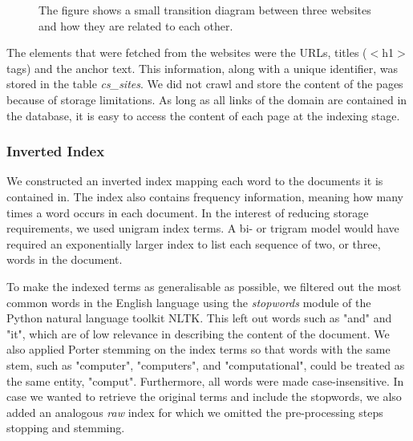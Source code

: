 \begin{figure}[!h]
\centering
\caption{The figure shows a small transition diagram between three websites and how they are related to each other.}
\label{fig:graph}
\end{figure}

The elements that were fetched from the websites were the URLs, titles ($<$h1$>$ tags) and the anchor text. This information, along with a unique identifier, was stored in the table \emph{cs\_sites}. We did not crawl and store the content of the pages because of storage limitations. As long as all links of the domain are contained in the database, it is easy to access the content of each page at the indexing stage.


\subsubsection{Inverted Index} %
\label{ssub:inverted_index}

We constructed an inverted index mapping each word to the documents it is contained in. The index also contains frequency information, meaning how many times a word occurs in each document. In the interest of reducing storage requirements, we used unigram index terms. A bi- or trigram model would have required an exponentially larger index to list each sequence of two, or three, words in the document.

To make the indexed terms as generalisable as possible, we filtered out the most common words in the English language using the \emph{stopwords} module of the Python natural language toolkit NLTK. This left out words such as "and" and "it", which are of low relevance in describing the content of the document. We also applied Porter stemming \cite{porter1980algorithm} on the index terms so that words with the same stem, such as "computer", "computers", and "computational", could be treated as the same entity, "comput". Furthermore, all words were made case-insensitive. In case we wanted to retrieve the original terms and include the stopwords, we also added an analogous \emph{raw} index for which we omitted the pre-processing steps stopping and stemming. \\

